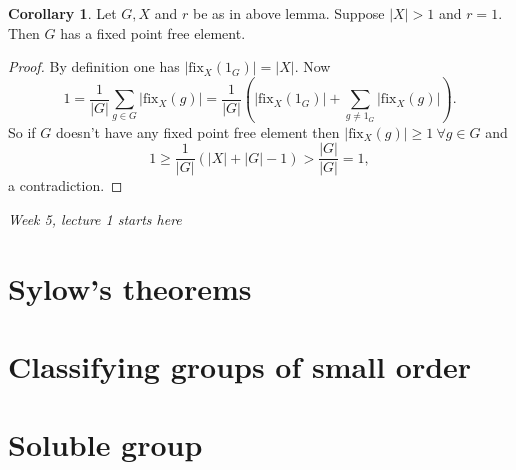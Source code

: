 \documentclass[a4paper]{article}
\newcommand{\fix}{\text{fix}}
\theoremstyle{definition}
\newtheorem{coro}[defn]{Corollary}
\begin{document}
\begin{coro}
Let $G,X$ and $r$ be as in above lemma. Suppose $|X|>1$ and $r=1$. Then $G$ has a fixed point free element.
\end{coro}
\begin{proof}
By definition one has $|\fix_X(1_G)|=|X|$. Now
\[
1=\frac{1}{|G|}\sum_{g\in G} |\fix_X(g)|=\frac{1}{|G|}\left(|\fix_X(1_G)|+\sum_{g\neq 1_G} |\fix_X(g)|\right).
\]
So if $G$ doesn't have any fixed point free element then $|\fix_X(g)|\geq 1 \ \forall g\in G$ and
\[
1\geq \frac{1}{|G|}(|X|+|G|-1)>\frac{|G|}{|G|}=1,
\]
a contradiction.
\end{proof}

\begin{flushright}
\textit{Week 5, lecture 1 starts here}
\end{flushright}

\section{Sylow's theorems}

\section{Classifying groups of small order}

\section{Soluble group}
\end{document}
